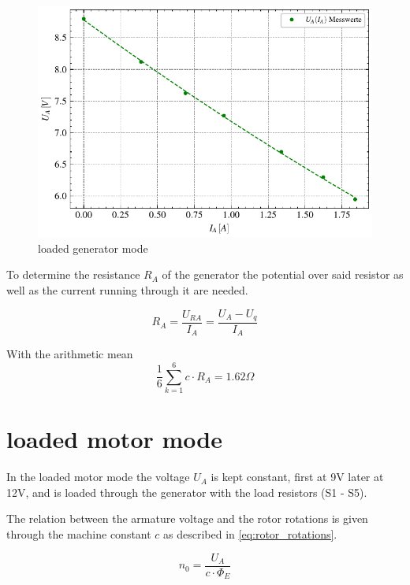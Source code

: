 \documentclass[conference]{IEEEtran}
\begin{document}
\begin{figure}[htbp]
    \centering
    \includegraphics[width=\columnwidth]{plots/4.2_Belasteter_Generator_4000.pdf}
    \caption{loaded generator mode}
    \label{fig:load_generator_mode}
\end{figure}

To determine the resistance $R_A$ of the generator the potential over said
resistor as well as the current running through it are needed.

\begin{equation} \label{eq:R_A_resistance}
    R_A = \frac{U_{RA}}{I_A} = \frac{U_A - U_q}{I_A}
\end{equation}

With the arithmetic mean
\begin{equation}
    \frac{1}{6} \sum\limits_{k = 1}^{6} c \cdot R_A = 1.62 \Omega
\end{equation}


\section{loaded motor mode}
In the loaded motor mode the voltage $U_A$ is kept constant, first at 9V later
at 12V, and is loaded through the generator with the load resistors (S1 - S5).

The relation between the armature voltage and the rotor rotations is given
through the machine constant $c$ as described in \ref{eq:rotor_rotations}.

\begin{equation} \label{eq:rotor_rotations}
    n_0 = \frac{U_A}{c \cdot \Phi_E}
\end{equation}
\end{document}
